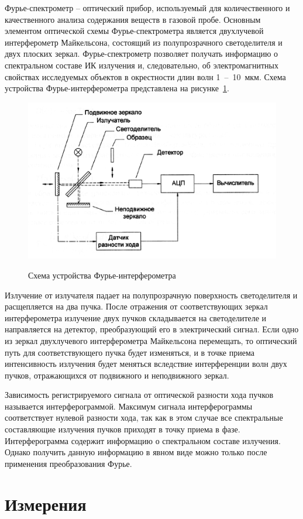 \documentclass[a4paper,12pt]{article} %
\begin{document}
    Фурье-спектрометр -- оптический прибор, используемый для количественного и качественного анализа содержания веществ в газовой пробе. 
    Основным элементом оптической схемы Фурье-спектрометра является двухлучевой интерферометр Майкельсона, 
    состоящий из полупрозрачного светоделителя и двух плоских зеркал. 
    Фурье-спектрометр позволяет получать информацию о спектральном составе ИК излучения и, следовательно, 
    об электромагнитных свойствах исследуемых объектов в окрестности длин волн 1 -- 10 мкм. 
    Схема устройства Фурье-интерферометра представлена на рисунке \hyperref[picture_1]{1}.

    \begin{figure}[h!]
        \centering
        \includegraphics[width=0.48\linewidth]{1.png}
        \label{picture_1}
        \caption{Схема устройства Фурье-интерферометра}
    \end{figure}

    Излучение от излучателя падает на полупрозрачную поверхность светоделителя и расщепляется на два пучка. 
    После отражения от соответствующих зеркал интерферометра излучение двух пучков складывается на светоделителе и направляется на детектор, 
    преобразующий его в электрический сигнал. Если одно из зеркал двухлучевого интерферометра Майкельсона перемещать, 
    то оптический путь для соответствующего пучка будет изменяться, 
    и в точке приема интенсивность излучения будет меняться вследствие интерференции волн двух пучков, 
    отражающихся от подвижного и неподвижного зеркал.

    Зависимость регистрируемого сигнала от оптической разности хода пучков называется интерферограммой. 
    Максимум сигнала интерферограммы соответствует нулевой разности хода, 
    так как в этом случае все спектральные составляющие излучения пучков приходят в точку приема в фазе. 
    Интерферограмма содержит информацию о спектральном составе излучения. 
    Однако получить данную информацию в явном виде можно только после применения преобразования Фурье.

    \newpage

    \section{Измерения}
\end{document}
